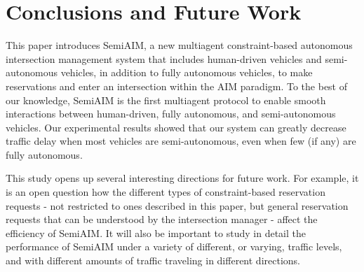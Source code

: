 \section{Conclusions and Future Work}
\label{sec:conclusions}

This paper introduces SemiAIM, a new multiagent constraint-based
autonomous intersection management system that includes human-driven
vehicles and semi-autonomous vehicles, in addition to fully autonomous
vehicles, to make reservations and enter an intersection within the
AIM paradigm.  To the best of our knowledge, SemiAIM is the first
multiagent protocol to enable smooth interactions between
human-driven, fully autonomous, and semi-autonomous vehicles.  Our
experimental results showed that our system can greatly decrease
traffic delay when most vehicles are semi-autonomous, even when few
(if any) are fully autonomous.

This study opens up several interesting directions for future work.
For example, it is an open question how the different types of
constraint-based reservation requests - not restricted to ones
described in this paper, but general reservation requests that can be
understood by the intersection manager - affect the efficiency of
SemiAIM.  It will
also be important to study in detail the performance of SemiAIM under
a variety of different, or varying, traffic levels, and with different
amounts of traffic traveling in different directions.

